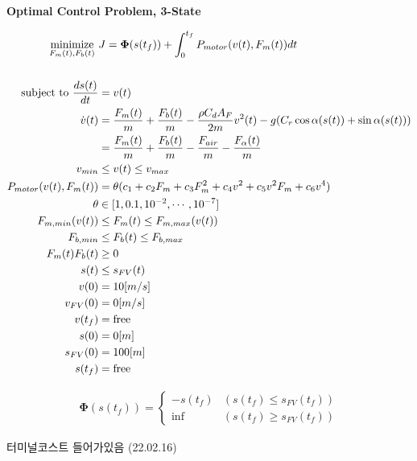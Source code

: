 \documentclass[a4paper]{article}
\begin{document}
	
	\textbf{Optimal Control Problem, 3-State}
	
	\begin{align}
		\underset{F_m(t),F_b(t)}{\mbox{minimize}} \ & J = \mathbf{\Phi}(s(t_f)) + \int_{0}^{t_f} P_{motor}(v(t),F_{m}(t))dt \\ \\
		\mbox{subject to} \
		{ds(t)\over dt} & = v(t) \\
		\dot{v}(t) & = {F_m(t)\over m}+{F_b(t)\over m}-{\rho C_d A_F \over 2m}v^2(t) - g(C_r \cos{\alpha(s(t))} + \sin{\alpha (s(t))}) \\
		& = {F_m(t) \over m} + {F_b(t) \over m} - {F_{air} \over m} - {F_\alpha (t) \over m} \\
		v_{min} &\le v(t) \le v_{max} \\
		P_{motor}(v(t),F_m(t)) & = \theta(c_1+c_2F_m+c_3F_m^2+c_4v^2+c_5v^2F_m+c_6v^4)\\
		\theta & \in [1, 0.1, 10^{-2}, \cdots,10^{-7}]\\
		F_{m,min}(v(t)) &\le F_m(t) \le F_{m,max}(v(t)) \\
		F_{b,min} &\le F_b(t) \le F_{b,max} \\
		F_m(t)F_b(t) &\ge 0 \\
		s(t) &\le s_{FV}(t) \\
		v(0) &= 10[m/s] \\
		v_{FV}(0) & = 0[m/s] \\
		v(t_f)& = \text{free} \\
		s(0) & = 0[m] \\
		s_{FV}(0) & = 100[m] \\
		s(t_f) & = \text{free}
	\end{align}
	
	\begin{align}
		\mathbf{\Phi}(s(t_f)) = \begin{cases}
			-s(t_f) & (s(t_f)  \le s_{FV}(t_f)) \\
			\inf & (s(t_f) \ge s_{FV}(t_f))
		\end{cases}
	\end{align}
	
터미널코스트 들어가있음 (22.02.16)
	
\end{document}
